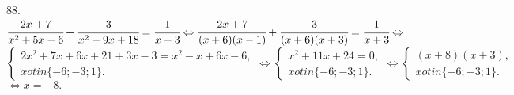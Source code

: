 88. $\cfrac{2x+7}{x^2+5x-6}+\cfrac{3}{x^2+9x+18}=\cfrac{1}{x+3}\Leftrightarrow
\cfrac{2x+7}{(x+6)(x-1)}+\cfrac{3}{(x+6)(x+3)}=\cfrac{1}{x+3}\Leftrightarrow$\\$
\begin{cases} 2x^2+7x+6x+21+3x-3=x^2-x+6x-6,\\
x
otin\{-6;-3;1\}.\end{cases}\Leftrightarrow
\begin{cases} x^2+11x+24=0,\\
x
otin\{-6;-3;1\}.\end{cases}\Leftrightarrow
\begin{cases} (x+8)(x+3),\\
x
otin\{-6;-3;1\}.\end{cases}$\\$\Leftrightarrow x=-8.$\\
